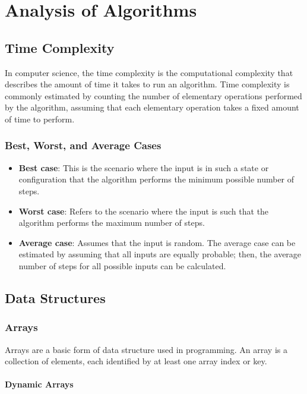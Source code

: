 \section*{Analysis of Algorithms}

\subsection*{Time Complexity}

In computer science, the time complexity is the computational complexity that describes the amount of time it takes to run an algorithm. Time complexity is commonly estimated by counting the number of elementary operations performed by the algorithm, assuming that each elementary operation takes a fixed amount of time to perform.

\subsubsection*{Best, Worst, and Average Cases}

\begin{itemize}
	\item \textbf{Best case}: This is the scenario where the input is in such a state or configuration that the algorithm performs the minimum possible number of steps.
	\item \textbf{Worst case}: Refers to the scenario where the input is such that the algorithm performs the maximum number of steps.
	\item \textbf{Average case}: Assumes that the input is random. The average case can be estimated by assuming that all inputs are equally probable; then, the average number of steps for all possible inputs can be calculated.
\end{itemize}

\subsection*{Data Structures}

\subsubsection*{Arrays}

Arrays are a basic form of data structure used in programming. An array is a collection of elements, each identified by at least one array index or key.

\paragraph*{Dynamic Arrays}

